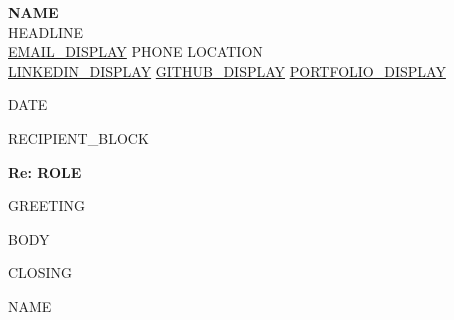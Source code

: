 \documentclass[letterpaper,11pt]{article}
\begin{document}
\begin{center}
  {\LARGE\bfseries\color{accent} {{NAME}} }\\[3pt]
  {\small {{HEADLINE}} }\\[4pt]
  \small
  \href{mailto:{{EMAIL_URL}}}{{{EMAIL_DISPLAY}}} \textbar{}
  {{PHONE}} \textbar{}
  {{LOCATION}}\\
  \href{{{LINKEDIN_URL}}}{{{LINKEDIN_DISPLAY}}} \textbar{}
  \href{{{GITHUB_URL}}}{{{GITHUB_DISPLAY}}} \textbar{}
  \href{{{PORTFOLIO_URL}}}{{{PORTFOLIO_DISPLAY}}}
\end{center}

\vspace{20pt}

{{DATE}}

{{RECIPIENT_BLOCK}}

\textbf{Re: {{ROLE}}}

{{GREETING}}

{{BODY}}

{{CLOSING}}

\vspace{18pt}
{{NAME}}
\end{document}

